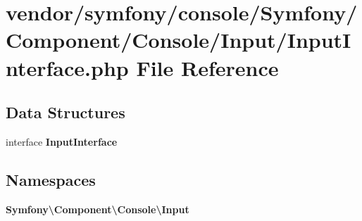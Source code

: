 \section{vendor/symfony/console/\+Symfony/\+Component/\+Console/\+Input/\+Input\+Interface.php File Reference}
\label{_input_interface_8php}
\subsection*{Data Structures}
\begin{DoxyCompactItemize}
\item 
interface {\bf Input\+Interface}
\end{DoxyCompactItemize}
\subsection*{Namespaces}
\begin{DoxyCompactItemize}
\item 
 {\bf Symfony\textbackslash{}\+Component\textbackslash{}\+Console\textbackslash{}\+Input}
\end{DoxyCompactItemize}
